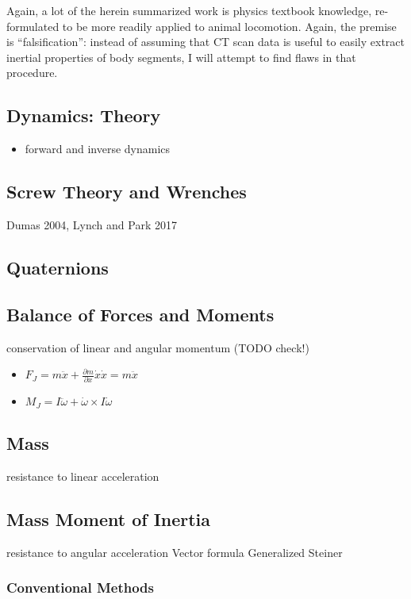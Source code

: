 Again, a lot of the herein summarized work is physics textbook knowledge, re-formulated to be more readily applied to animal locomotion.
Again, the premise is ``falsification'': instead of assuming that CT scan data is useful to easily extract inertial properties of body segments, I will attempt to find flaws in that procedure.


\subsection{Dynamics: Theory}
\label{sec:org6d0e666}
\begin{itemize}
\item forward and inverse dynamics
\end{itemize}

\subsection{Screw Theory and Wrenches}
\label{sec:orgfc04ba7}
Dumas 2004, Lynch and Park 2017

\subsection{Quaternions}
\label{sec:org65e1cb2}

\subsection{Balance of Forces and Moments}
\label{sec:org0ccd151}
conservation of linear and angular momentum (TODO check!)
\begin{itemize}
\item \(F_J = m\ddot{x} + \frac{\partial m}{\partial x} \dot{x}\dot{x} = m\ddot{x}\)
\item \(M_J = I\ddot{\omega} + \dot{\omega} \times I\dot{\omega}\)
\end{itemize}

\subsection{Mass}
\label{sec:org3ee3a48}
resistance to linear acceleration

\subsection{Mass Moment of Inertia}
\label{sec:org05fc151}
resistance to angular acceleration
Vector formula
Generalized Steiner
\subsubsection{Conventional Methods}
\label{sec:orgf0a43d8}
